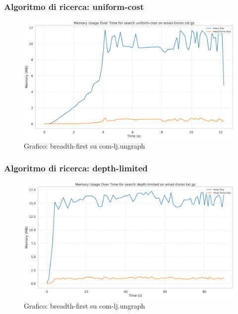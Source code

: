 \documentclass{article}
\begin{document}
\subsubsection{Algoritmo di ricerca: uniform-cost}
\begin{figure}[htbp]\centering
\includegraphics[width=\textwidth]{../plots/email-Enron_uniform-cost.png}
\caption{Grafico: breadth-first su com-lj.ungraph}
\end{figure}
\subsubsection{Algoritmo di ricerca: depth-limited}
\begin{figure}[htbp]\centering
\includegraphics[width=\textwidth]{../plots/email-Enron_depth-limited.png}
\caption{Grafico: breadth-first su com-lj.ungraph}
\end{figure}
\end{document}
